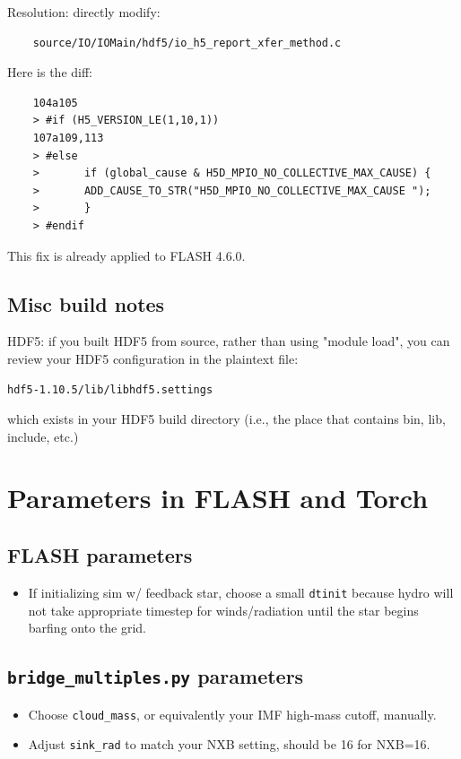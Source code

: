 \documentclass[10pt]{article}
\begin{document}
Resolution: directly modify:
\begin{verbatim}
    source/IO/IOMain/hdf5/io_h5_report_xfer_method.c
\end{verbatim}
Here is the diff:
\begin{verbatim}
    104a105
    > #if (H5_VERSION_LE(1,10,1))
    107a109,113
    > #else
    >       if (global_cause & H5D_MPIO_NO_COLLECTIVE_MAX_CAUSE) {
    >       ADD_CAUSE_TO_STR("H5D_MPIO_NO_COLLECTIVE_MAX_CAUSE ");
    >       }
    > #endif
\end{verbatim}
This fix is already applied to FLASH 4.6.0.

\subsection{Misc build notes}

HDF5: if you built HDF5 from source, rather than using "module load",
you can review your HDF5 configuration in the plaintext file:
\begin{verbatim}
hdf5-1.10.5/lib/libhdf5.settings
\end{verbatim}
which exists in your HDF5 build directory (i.e., the place that contains bin,
lib, include, etc.)

\section{Parameters in FLASH and Torch}

\subsection{FLASH parameters}

\begin{itemize}
    \item If initializing sim w/ feedback star, choose a small \texttt{dtinit}
        because hydro will not take appropriate timestep for winds/radiation
        until the star begins barfing onto the grid.
\end{itemize}

\subsection{\texttt{bridge\_multiples.py} parameters}

\begin{itemize}
    \item Choose \texttt{cloud\_mass}, or equivalently your IMF high-mass
        cutoff, manually.
    \item Adjust \texttt{sink\_rad} to match your NXB setting,
        should be 16 for NXB=16.
\end{itemize}
\end{document}
